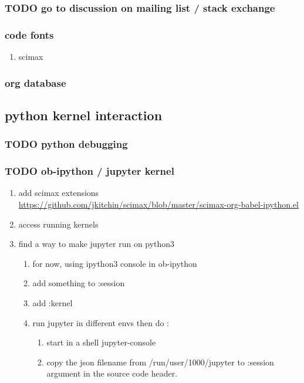 \documentclass[11pt]{article}
\begin{document}
\subsubsection{{\bfseries\sffamily TODO} go to discussion on mailing list / stack exchange}
\label{sec:orga12de20}
\subsubsection{code fonts}
\label{sec:orgb43b751}
\begin{enumerate}
\item scimax
\label{sec:orgb367a93}
\end{enumerate}
\subsubsection{org database}
\label{sec:orged78c8b}
\subsection{python kernel interaction}
\label{sec:org0e192cb}
\subsubsection{{\bfseries\sffamily TODO} python debugging}
\label{sec:org6a118d6}
\subsubsection{{\bfseries\sffamily TODO} ob-ipython / jupyter kernel}
\label{sec:org7d4c7f4}
\begin{enumerate}
\item add scimax extensions
\label{sec:orgda80981}
\url{https://github.com/jkitchin/scimax/blob/master/scimax-org-babel-ipython.el}
\item access running kernels
\label{sec:org4286fa2}
\item find a way to make jupyter run on python3
\label{sec:orgefa697c}
\begin{enumerate}
\item for now, using ipython3 console in ob-ipython
\label{sec:org0ff5ad9}
\item add something to :session
\label{sec:org99a0b1d}
\item add :kernel
\label{sec:orgbaf31ad}
\item run jupyter in different envs
\label{sec:orgba66e19}
then do :
\begin{enumerate}
\item start in a shell jupyter-console
\item copy the json filename from /run/user/1000/jupyter to :session argument in the source code header.
\end{enumerate}
\end{enumerate}
\end{enumerate}
\end{document}
